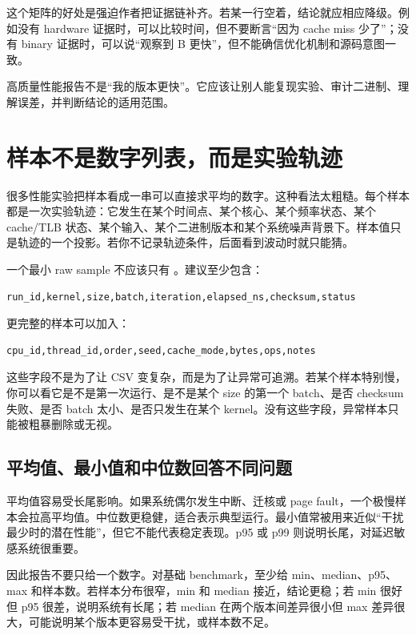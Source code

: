 这个矩阵的好处是强迫作者把证据链补齐。若某一行空着，结论就应相应降级。例如没有 hardware 证据时，可以比较时间，但不要断言“因为 cache miss 少了”；没有 binary 证据时，可以说“观察到 B 更快”，但不能确信优化机制和源码意图一致。

\begin{keyidea}
高质量性能报告不是“我的版本更快”。它应该让别人能复现实验、审计二进制、理解误差，并判断结论的适用范围。
\end{keyidea}

\section{样本不是数字列表，而是实验轨迹}

很多性能实验把样本看成一串可以直接求平均的数字。这种看法太粗糙。每个样本都是一次实验轨迹：它发生在某个时间点、某个核心、某个频率状态、某个 cache/TLB 状态、某个输入、某个二进制版本和某个系统噪声背景下。样本值只是轨迹的一个投影。若你不记录轨迹条件，后面看到波动时就只能猜。

一个最小 raw sample 不应该只有 。建议至少包含：

\begin{lstlisting}
run_id,kernel,size,batch,iteration,elapsed_ns,checksum,status
\end{lstlisting}

更完整的样本可以加入：

\begin{lstlisting}
cpu_id,thread_id,order,seed,cache_mode,bytes,ops,notes
\end{lstlisting}

这些字段不是为了让 CSV 变复杂，而是为了让异常可追溯。若某个样本特别慢，你可以看它是不是第一次运行、是不是某个 size 的第一个 batch、是否 checksum 失败、是否 batch 太小、是否只发生在某个 kernel。没有这些字段，异常样本只能被粗暴删除或无视。

\subsection{平均值、最小值和中位数回答不同问题}

平均值容易受长尾影响。如果系统偶尔发生中断、迁核或 page fault，一个极慢样本会拉高平均值。中位数更稳健，适合表示典型运行。最小值常被用来近似“干扰最少时的潜在性能”，但它不能代表稳定表现。p95 或 p99 则说明长尾，对延迟敏感系统很重要。

因此报告不要只给一个数字。对基础 benchmark，至少给 min、median、p95、max 和样本数。若样本分布很窄，min 和 median 接近，结论更稳；若 min 很好但 p95 很差，说明系统有长尾；若 median 在两个版本间差异很小但 max 差异很大，可能说明某个版本更容易受干扰，或样本数不足。

